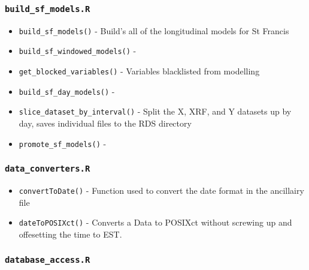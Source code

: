 \documentclass[
]{book}
\providecommand{\tightlist}{%
  \setlength{\itemsep}{0pt}\setlength{\parskip}{0pt}}
\begin{document}
\hypertarget{build_sf_models.r}{%
\subsubsection{\texorpdfstring{\texttt{build\_sf\_models.R}}{build\_sf\_models.R}}\label{build_sf_models.r}}

\begin{itemize}
\tightlist
\item
  \texttt{build\_sf\_models()} - Build's all of the longitudinal models for St Francis
\item
  \texttt{build\_sf\_windowed\_models()} -
\item
  \texttt{get\_blocked\_variables()} - Variables blacklisted from modelling
\item
  \texttt{build\_sf\_day\_models()} -
\item
  \texttt{slice\_dataset\_by\_interval()} - Split the X, XRF, and Y datasets up by day, saves individual files to the RDS directory
\item
  \texttt{promote\_sf\_models()} -
\end{itemize}

\hypertarget{data_converters.r}{%
\subsubsection{\texorpdfstring{\texttt{data\_converters.R}}{data\_converters.R}}\label{data_converters.r}}

\begin{itemize}
\tightlist
\item
  \texttt{convertToDate()} - Function used to convert the date format in the ancillairy file
\item
  \texttt{dateToPOSIXct()} - Converts a Data to POSIXct without screwing up and offesetting the time to EST.
\end{itemize}

\hypertarget{database_access.r}{%
\subsubsection{\texorpdfstring{\texttt{database\_access.R}}{database\_access.R}}\label{database_access.r}}
\end{document}
